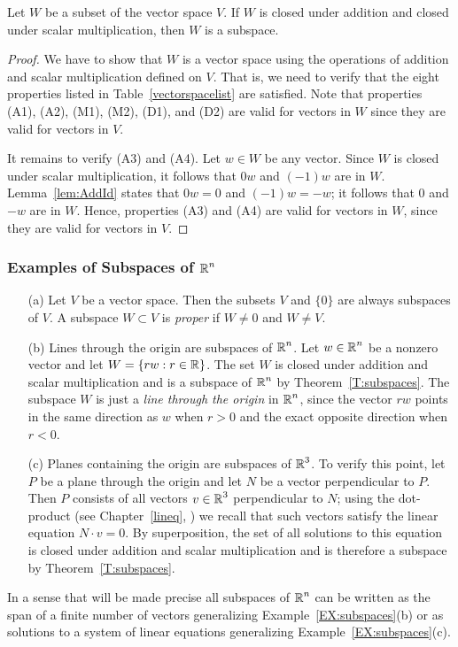 \documentclass{ximera}
\begin{document}
\begin{theorem}  \label{T:subspaces}
Let $W$ be a subset of the vector space $V$. If $W$ is closed under addition 
and closed under scalar multiplication, then $W$ is a subspace.
\end{theorem}
\begin{proof}  We have to show that $W$ is a vector space using the operations 
of addition and scalar multiplication defined on $V$.  That is, we need to
verify that the eight properties listed in Table~\ref{vectorspacelist} are 
satisfied.  Note that properties (A1), (A2), (M1), (M2), (D1), and (D2) are 
valid for vectors in $W$ since they are valid for vectors in $V$.

It remains to verify (A3) and (A4).  Let $w\in W$ be any vector.
Since $W$ is closed under scalar multiplication, it follows that
$0w$ and $(-1)w$ are in $W$. Lemma~\ref{lem:AddId} states that
$0w=0$ and $(-1)w=-w$; it follows that $0$ and $-w$ are in $W$.
Hence, properties (A3) and (A4) are valid for vectors in $W$,
since they are valid for vectors in $V$.  \end{proof}

\subsubsection*{Examples of Subspaces of $\mbox{$\Bbb{R}$}^n$}

\begin{example}  \label{EX:subspaces}
{\rm
\begin{itemize}
\item[(a)] Let $V$ be a vector space.  Then the subsets $V$ and $\{0\}$ are
always subspaces of $V$.  A subspace $W\subset V$ is {\em proper\/} if
$W\neq 0$ and $W\neq V$. 
\item[(b)] Lines through the origin are subspaces of $\mbox{$\Bbb{R}$}^n$.  Let $w\in \mbox{$\Bbb{R}$}^n$
be a nonzero vector and let $W=\{rw:r\in\mbox{$\Bbb{R}$}\}$.  The set $W$ is closed under
addition and scalar multiplication and is a subspace of $\mbox{$\Bbb{R}$}^n$ by 
Theorem~\ref{T:subspaces}.
The subspace $W$ is just a {\em line through the origin\/} in $\mbox{$\Bbb{R}$}^n$, since
the vector $rw$ points in the same direction as $w$ when $r>0$ and the exact
opposite direction when $r<0$.
\item[(c)]  Planes containing the origin are subspaces of $\mbox{$\Bbb{R}$}^3$.  To verify
this point, let $P$ be a plane through the origin and let $N$ be a vector
perpendicular to $P$.  Then $P$ consists of all vectors
$v\in\mbox{$\Bbb{R}$}^3$ perpendicular to $N$; using the dot-product (see Chapter~\ref{lineq},
) we recall that such vectors satisfy the linear equation
$N\cdot v = 0$.  By superposition, the set of all
solutions to this equation is closed under addition and scalar multiplication
and is therefore a subspace by Theorem~\ref{T:subspaces}.
\end{itemize}
}
\end{example}
In a sense that will be made precise all subspaces of $\mbox{$\Bbb{R}$}^n$ can be written
as the span of a finite number of vectors generalizing
Example~\ref{EX:subspaces}(b) or as solutions to a system of linear equations
generalizing Example~\ref{EX:subspaces}(c).
\end{document}
